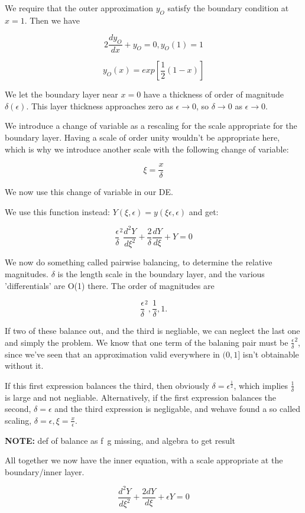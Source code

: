 \documentclass[12pt]{report}
\begin{document}
We require that the outer approximation $y_O$ satisfy the boundary
condition at $x=1$. Then we have

$$2 \frac{dy_O}{dx} + y_O = 0, y_O(1)=1$$

$$y_O(x) = exp[\frac 1 2 (1-x)]$$

We let the boundary layer near $x=0$ have a thickness of order of
magnitude $\delta(\epsilon)$. This layer thickness approaches zero as
$\epsilon \to 0$, so $\delta \to 0$ as $\epsilon \to 0$.

We introduce a change of variable as a rescaling for the scale
appropriate for the boundary layer. Having a scale of order unity
wouldn't be appropriate here, which is why we introduce another scale
with the following change of variable:

$$\xi = \frac x \delta$$

We now use this change of variable in our DE.

We use this function instead: $Y(\xi, \epsilon) = y(\xi \epsilon,
\epsilon)$ and get:

$$\frac \epsilon \delta^2 \frac{d^2Y}{d\xi^2} + \frac 2 \delta
\frac{dY}{d\xi} + Y = 0$$

We now do something called pairwise balancing, to determine the
relative magnitudes. $\delta$ is the length scale in the boundary
layer, and the various 'differentials' are O(1) there. The order of
magnitudes are

$$\frac \epsilon \delta^2, \frac 1 \delta, 1.$$

If two of these balance out, and the third is negliable, we can
neglect the last one and simply the problem. We know that one term of
the balaning pair must be $\frac \epsilon \delta^2$, since we've seen
that an approximation valid everywhere in $(0,1]$ isn't obtainable
  without it.

If this first expression balances the third, then obviously $\delta =
\epsilon^{\frac 1 2}$, which implies $\frac 1 \delta$ is large and not
negliable. Alternatively, if the first expression balances the second,
$\delta = \epsilon$ and the third expression is negligable, and wehave
found a so called scaling, $\delta = \epsilon, \xi=\frac x \epsilon$.

\textbf{NOTE:} def of balance as f~g missing, and algebra to get
result

All together we now have the inner equation, with a scale appropriate
at the boundary/inner layer.

$$\frac{d^2Y}{d\xi^2} + \frac{2dY}{d\xi} + \epsilon Y = 0$$
\end{document}
